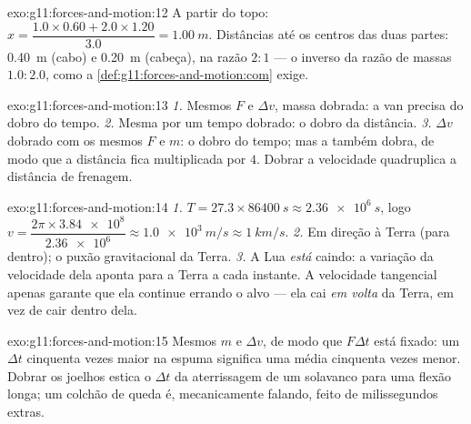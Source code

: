 \begin{solution}{exo:g11:forces-and-motion:12}
A partir do topo:
$x = \dfrac{1.0 \times 0.60 + 2.0 \times 1.20}{3.0} = \qty{1.00}{m}$.
Distâncias até os centros das duas partes: \qty{0.40}{m} (cabo) e
\qty{0.20}{m} (cabeça), na razão $2 : 1$ --- o inverso da razão de massas
$1.0 : 2.0$, como a \cref{def:g11:forces-and-motion:com} exige.
\end{solution}

\begin{solution}{exo:g11:forces-and-motion:13}
\emph{1.} Mesmos $F$ e $\Delta v$, massa dobrada: a van precisa do dobro
do tempo. \emph{2.} Mesma  por um tempo dobrado: o dobro
da distância. \emph{3.} $\Delta v$ dobrado com os mesmos $F$ e $m$: o
dobro do tempo; mas a  também dobra, de modo que a
distância fica multiplicada por $4$. Dobrar a velocidade quadruplica a
distância de frenagem.
\end{solution}

\begin{solution}{exo:g11:forces-and-motion:14}
\emph{1.} $T = 27.3 \times \qty{86400}{s} \approx \qty{2.36e6}{s}$, logo
$v = \dfrac{2\pi \times \num{3.84e8}}{\num{2.36e6}} \approx
\qty{1.0e3}{m/s} \approx \qty{1}{km/s}$. \emph{2.} Em direção à Terra
(para dentro); o puxão gravitacional da Terra. \emph{3.} A Lua
\emph{está} caindo: a variação da velocidade dela aponta para a Terra a
cada instante. A velocidade tangencial apenas garante que ela continue
errando o alvo --- ela cai \emph{em volta} da Terra, em vez de cair
dentro dela.
\end{solution}

\begin{solution}{exo:g11:forces-and-motion:15}
Mesmos $m$ e $\Delta v$, de modo que $F\Delta t$ está fixado: um
$\Delta t$ cinquenta vezes maior na espuma significa uma  média
cinquenta vezes menor. Dobrar os joelhos estica o $\Delta t$ da
aterrissagem de um solavanco para uma flexão longa; um colchão de queda
é, mecanicamente falando, feito de milissegundos extras.
\end{solution}

